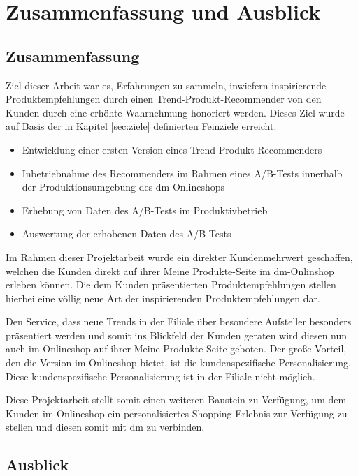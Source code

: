 \chapter{Zusammenfassung und Ausblick}
\label{ch:resumee}

\section{Zusammenfassung}
\label{sec:fazit}

Ziel dieser Arbeit war es, Erfahrungen zu sammeln, inwiefern inspirierende Produktempfehlungen durch einen Trend-Produkt-Recommender von den Kunden durch eine erhöhte Wahrnehmung honoriert werden. Dieses Ziel wurde auf Basis der in Kapitel \ref{sec:ziele} definierten Feinziele erreicht:
\begin{itemize}
	\item Entwicklung einer ersten Version eines Trend-Produkt-Recommenders \checkmark
	\item Inbetriebnahme des Recommenders im Rahmen eines A/B-Tests innerhalb der Produktionsumgebung des dm-Onlineshops \checkmark
	\item Erhebung von Daten des A/B-Tests im Produktivbetrieb \checkmark
	\item Auswertung der erhobenen Daten des A/B-Tests \checkmark
\end{itemize}

Im Rahmen dieser Projektarbeit wurde ein direkter Kundenmehrwert geschaffen, welchen die Kunden direkt auf ihrer \glqq Meine Produkte\grqq-Seite im dm-Onlinshop erleben können. Die dem Kunden präsentierten Produktempfehlungen stellen hierbei eine völlig neue Art der inspirierenden Produktempfehlungen dar. 

Den Service, dass neue Trends in der Filiale über besondere Aufsteller besonders präsentiert werden und somit ins Blickfeld der Kunden geraten wird diesen nun auch im Onlineshop auf ihrer \glqq Meine Produkte\grqq-Seite  geboten. Der große Vorteil, den die Version im Onlineshop bietet, ist die kundenspezifische Personalisierung. Diese kundenspezifische Personalisierung ist in der Filiale nicht möglich. 

Diese Projektarbeit stellt somit einen weiteren Baustein zu Verfügung, um dem Kunden im Onlineshop ein personalisiertes Shopping-Erlebnis zur Verfügung zu stellen und diesen somit mit dm zu verbinden.

\section{Ausblick}
\label{sec:ausblick}

